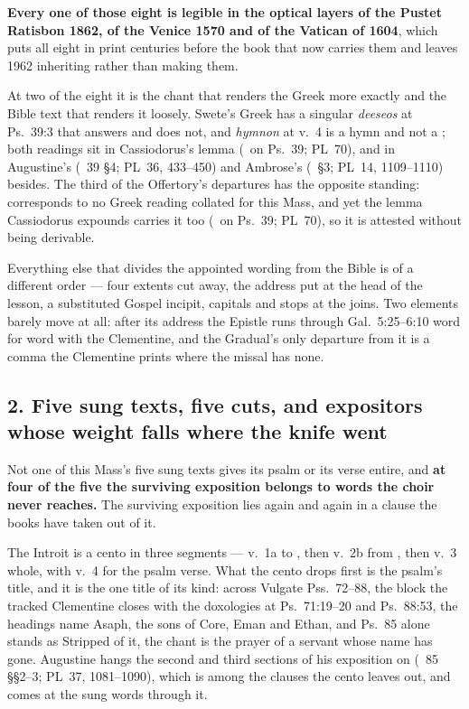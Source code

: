 \textbf{Every one of those eight is legible in the optical layers of the
Pustet Ratisbon 1862, of the Venice 1570 and of the Vatican  of
1604}, which puts all eight in print centuries before the book that now
carries them and leaves 1962 inheriting rather than making them.

At two of the eight it is the chant that renders the Greek more exactly and
the Bible text that renders it loosely. Swete's Greek has a singular
\emph{deeseos} at Ps.\ 39:3 that  answers and
 does not, and \emph{hymnon} at v.~4 is a hymn and not a
; both readings sit in Cassiodorus's lemma (\ on
Ps.~39; PL~70), and  in Augustine's (~39 §4;
PL~36, 433--450) and Ambrose's (~§3; PL~14, 1109--1110)
besides. The third of the Offertory's departures has the opposite standing:
 corresponds to no Greek reading collated for this Mass,
and yet the lemma Cassiodorus expounds carries it too (\ on
Ps.~39; PL~70), so it is attested without being derivable.

Everything else that divides the appointed wording from the Bible is of a
different order --- four extents cut away, the address  put at
the head of the lesson, a substituted Gospel incipit, capitals and stops at
the joins. Two elements barely move at all: after its address the Epistle runs
through Gal.\ 5:25--6:10 word for word with the Clementine, and the Gradual's
only departure from it is a comma the Clementine prints where the missal has
none.

\subsection*{2. Five sung texts, five cuts, and expositors whose weight falls where the knife went}

Not one of this Mass's five sung texts gives its psalm or its verse entire,
and \textbf{at four of the five the surviving exposition belongs to words the
choir never reaches.} The surviving exposition lies again and again in a clause
the books have taken out of it.

The Introit is a cento in three segments --- v.~1a to , then
v.~2b from , then v.~3 whole, with v.~4 for the psalm verse.
What the cento drops first is the psalm's title, and it is the one title
of its kind: across Vulgate Pss.\ 72--88, the block the tracked Clementine
closes with the doxologies at Ps.\ 71:19--20 and Ps.\ 88:53, the headings name
Asaph, the sons of Core, Eman and Ethan, and Ps.~85 alone stands as
 Stripped of it, the chant is the prayer of a
servant whose name has gone. Augustine hangs the second and third sections of
his exposition on  (~85
§§2--3; PL~37, 1081--1090), which is among the clauses the cento leaves out,
and comes at the sung words through it.

